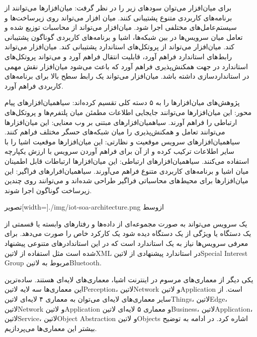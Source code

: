 برای میان‌افزار می‌توان سودهای زیر را در نظر گرفت:
 میان‌افزارها می‌توانند از برنامه‌های کاربردی متنوع پشتیبانی کنند.
 میان افزار می‌تواند روی زیرساخت‌ها و سیستم‌عامل‌های مختلفی اجرا شود.
 میان‌افزار می‌تواند از محاسبات توزیع شده و تعامل میان سرویس‌ها در بین شبکه‌ها، اشیا و برنامه‌های کاربردی گوناگون پشتیبانی کند.
 میان‌افزار می‌تواند از پروتکل‌های استاندارد پشتیبانی کند.
 میان‌افزار می‌تواند رابط‌های استاندارد فراهم آورد، قابلیت انتقال فراهم آورد و می‌تواند پروتکل‌های استاندارد در جهت همکنش‌پذیری فراهم آورد که باعث می‌شود میان‌افزار نقش مهمی در استانداردسازی داشته باشد.
 میان‌افزار می‌تواند یک رابط سطح بالا برای برنامه‌های کاربردی فراهم آورد.

پژوهش‌های میان‌افزارها را به ۵ دسته کلی تقسیم کرده‌اند:
 ‌سیاه{میان‌افزارهای پیام محور}: این میان‌افزارها می‌توانند جایجایی اطلاعات مطمئن میان پلتفرم‌ها و پروتکل‌های ارتباطی را فراهم آورند.
 ‌سیاه{میان‌افزارهای مبتنی بر وب معنایی}: این میان‌افزارها می‌توانند تعامل و همکنش‌پذیری را میان شبکه‌های حسگر مختلف فراهم کنند.
 ‌سیاه{میان‌افزارهای سرویس موقعیت و نظارتی}: این میان‌افزارها موقعیت اشیا را با سایر اطلاعات ترکیب کرده و از آن برای فراهم آوردن سرویس با ارزش یکپارچه استفاده می‌کنند.
 ‌سیاه{میان‌افزارهای ارتباطی}: این میان‌افزارها ارتباطات قابل اطمینان میان اشیا و برنامه‌های کاربردی متنوع فراهم می‌آورند.
 ‌سیاه{میان‌افرارهای فراگیر}: این میان‌افزارها برای محیط‌های محاسباتی فراگیر طراحی شده‌اند و می‌توانند روی چندین زیرساخت گوناگون اجرا شوند.

‌تصویر[width=\textwidth]{./img/iot-soa-architecture.png}
‌ازوسط

یک سرویس می‌تواند به صورت مجموعه‌ای از داده‌ها و رفتارهای وابسته یا قسمتی از یک دستگاه یا ویژگی از یک دستگاه دیده شود یک کارکرد خاص را صورت می‌دهد.
برای معرفی سرویس‌ها نیاز به یک استاندارد است که در این استاندادرهای متنوعی پیشنهاد شده است مثل استفاده از ‌لاتین{XML} در استاندارد پیشنهادی از ‌لاتین{Special Interest Group} مربوط به ‌لاتین{Bluetooth}.

یکی دیگر از معماری‌های مرسوم در اینترنت اشیا، معماری‌های لایه‌ای هستند. ساده‌ترین این معماری‌ها سه لایه ‌لاتین{Perception}، ‌لاتین{Network} و ‌لاتین{Application}
است. از سایر معماری‌های لایه‌ای می‌توان به معماری ۴ لایه‌ای ‌لاتین{Things}، ‌لاتین{Edge}، ‌لاتین{Network} و ‌لاتین{Application} و معماری ۵ لایه‌ای
‌لاتین{Business}، ‌لاتین{Application}، ‌لاتین{Service}، ‌لاتین{Object Abstraction} و ‌لاتین{Objects} اشاره کرد. در ادامه به توضیح بیشتر این معماری‌ها می‌پردازیم.

